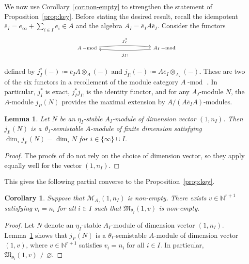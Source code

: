 \documentclass[pdftex]{sigma}%
\newtheorem{Corollary}[Theorem]{Corollary}
\newtheorem{Lemma}[Theorem]{Lemma}
\newcommand{\PiQ}{A}
\DeclareMathOperator{\module}{\mathrm{-mod}}
\numberwithin{equation}{section}
\begin{document}
We now use Corollary~\ref{cor:non-empty} to strengthen the statement of Proposition~\ref{prop:key}. Before stating the desired result, recall the idempotent $\overline{e}_I=e_\infty+\sum_{i\in I} e_i\in A$ and the algebra $A_I=\overline{e}_I A\overline{e}_I$. Consider the functors
 \[
\begin{tikzpicture}
\node (v1) at (0,0) {\scriptsize ${{\PiQ}\module}$};
\node (v2) at (4,0) {\scriptsize ${{\PiQ_I}\module}$};

\draw [->,bend right=-5] (v1) to node[above] {$\scriptstyle{j_I^*}$} (v2);
\draw [->,bend left=5] (v2) to node[below] {$\scriptstyle{j_{I!}}$} (v1);
\end{tikzpicture}
\]
 defined by $j_I^*(-)\coloneqq \overline{e}_I \PiQ \otimes_{\PiQ} (-)$ and $j_{I!}(-)\coloneqq \PiQ \overline{e}_I\otimes_{\PiQ_I}(-)$. These are two of the six functors in a recollement of the module category ${\PiQ}\module$ \cite[Section 3]{craw2018multigraded}. In particular, $j_I^*$ is exact, $j_I^*j_{I!}$ is the identity functor, and for any $\PiQ_I$-module $N$, the $\PiQ$-module $j_{I!}(N)$ provides the maximal extension by $\PiQ/(\PiQ \overline{e}_I\PiQ)$-modules.

\begin{Lemma}\label{lem:j!semistable}
Let $N$ be an $\eta_I$-stable $\PiQ_I$-module of dimension vector $(1,n_I)$. Then $j_{I!}(N)$ is a~$\theta_I$-semistable $\PiQ$-module of finite dimension satisfying $\dim_i j_{I!}(N)=\dim_i N$ for $i \in \{\infty\} \cup I$.
\end{Lemma}
\begin{proof}The proofs of \cite[Lemma~4.4 and Lemma~4.5]{craw2019punctual} do not rely on the choice of dimension vector, so they apply equally well for the vector $(1,n_I)$.
\end{proof}

This gives the following partial converse to the Proposition~\ref{prop:key}.

 \begin{Corollary} Suppose that $\mathcal{M}_{A_I}(1,n_I)$ is non-empty. There exists $v\in \mathbb{N}^{r+1}$ satisfying $v_i=n_i$ for all $i \in I$ such that $\mathfrak{M}_{\theta_I}(1,v)$ is non-empty.
 \end{Corollary}
 \begin{proof}
 Let $N$ denote an $\eta_I$-stable $A_I$-module of dimension vector $(1,n_I)$. Lemma~\ref{lem:j!semistable} shows that $j_{I!}(N)$ is a $\theta_I$-semistable $A$-module of dimension vector $(1,v)$, where $v\in \mathbb{N}^{r+1}$ satisfies $v_i=n_i$ for all $i\in I$. In particular, $\mathfrak{M}_{\theta_I}(1,v)\neq \varnothing$.
 \end{proof}
\end{document}

